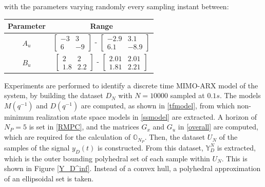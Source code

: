 \documentclass[letterpaper, 10 pt, conference]{ieeeconf}  %
\begin{document}
with the parameters varying randomly every sampling instant between:
\begin{table}[h!]
	\hspace{50pt}
	\begin{tabular}{||c|c||} 
		\hline
		Parameter & Range \vspace{1pt}\\ [0.5ex] 
		\hline
		$A_u$ & $\begin{bmatrix} -3 & 3 \\ 6 & -9 \end{bmatrix}$ - 
		$\begin{bmatrix} -2.9 & 3.1 \\ 6.1 & -8.9 \end{bmatrix}$  \vspace{1pt}\\
		$B_u$ & $\begin{bmatrix} 2 & 2 \\ 1.8 & 2.2 \end{bmatrix}$ - 
		$\begin{bmatrix} 2.01 & 2.01 \\ 1.81 & 2.21 \end{bmatrix}$  \\
		\hline
	\end{tabular}
	\label{Simparam}
	\vspace{-10pt}  
\end{table}
Experiments are performed to identify a discrete time MIMO-ARX model of the system, by building the dataset $D_N$ with $N=10000$ sampled at $0.1s$. The models $M(q^{-1})$ and $D(q^{-1})$ are computed, as shown in \eqref{tfmodel}, from which non-minimum realization state space models in \eqref{ssmodel} are extracted. A horizon of $N_P=5$ is set in \eqref{RMPC}, and the matrices $G_x$ and $G_u$ in \eqref{overall} are computed, which are required for the calculation of $\mathbb{O}_{N_P}$.
Then, the dataset $U_N$ of the samples of the signal $y_D(t)$ is constructed. From this dataset, $\mathbb{Y}_D^N$ is extracted, which is the outer bounding polyhedral set of each sample within $U_N$. This is shown in Figure \ref{Y_D^inf}. Instead of a convex hull, a polyhedral approximation of an ellipsoidal set is taken.
\end{document}
